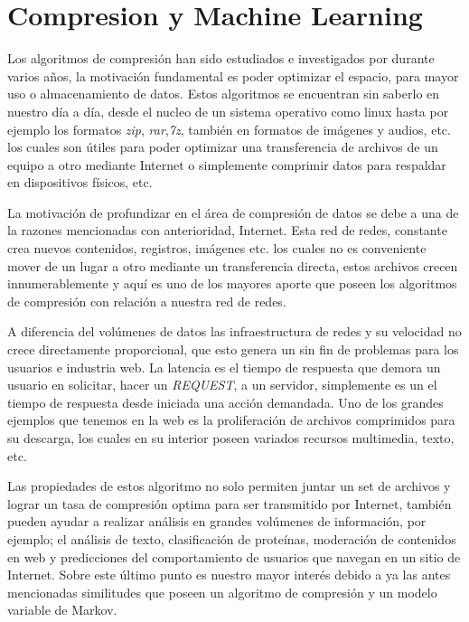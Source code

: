 \chapter[Compresion y Machine Learning]{Compresion y Machine Learning}
\label{ch:Compresion-Machine-Learning}




Los algoritmos de compresión han sido estudiados e investigados por durante varios años, la motivación
fundamental es poder optimizar el espacio, para mayor uso o almacenamiento de datos. Estos algoritmos se encuentran sin saberlo en nuestro día a día, desde el nucleo de un sistema operativo como linux hasta por ejemplo los formatos \emph{zip}, \emph{rar},\emph{7z}, también en formatos de imágenes y audios, etc. los cuales son útiles para poder optimizar una transferencia de archivos de un equipo a otro mediante Internet o simplemente comprimir datos para respaldar en dispositivos físicos, etc.

La motivación de profundizar en el área de compresión de datos se debe a una de la razones mencionadas con anterioridad, Internet. Esta red de redes, constante crea nuevos contenidos, registros, imágenes etc. los cuales no es conveniente mover de un lugar a otro mediante un transferencia directa, estos archivos crecen innumerablemente y aquí es uno de los mayores aporte que poseen los algoritmos de compresión con relación a nuestra red de redes. 

A diferencia del volúmenes de datos las infraestructura de redes y su velocidad no crece directamente proporcional, que esto genera un sin fin de problemas para los usuarios e industria web. La latencia  es el tiempo de respuesta que demora un usuario en solicitar, hacer un \emph{REQUEST}, a un servidor, simplemente es un el tiempo de respuesta desde iniciada una acción demandada. 
Uno de los grandes ejemplos que tenemos en la web es la proliferación de archivos comprimidos para su descarga, los cuales en su interior poseen variados recursos multimedia, texto, etc.

Las propiedades de estos algoritmo no solo permiten juntar un set de archivos y lograr un tasa de compresión optima para ser transmitido por Internet, también pueden ayudar a realizar análisis en grandes volúmenes de información, por ejemplo; el análisis de texto, clasificación de proteínas, moderación de contenidos en web y predicciones del comportamiento de usuarios que navegan en un sitio de Internet. Sobre este último punto es nuestro mayor interés debido a ya las antes mencionadas similitudes que poseen un algoritmo de compresión y un modelo variable de Markov.

